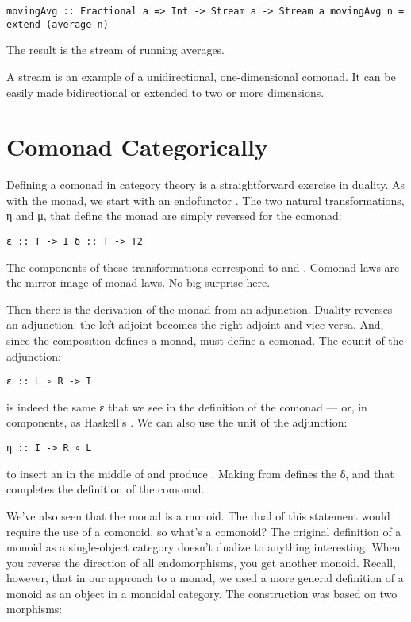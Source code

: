 \begin{verbatim}
movingAvg :: Fractional a => Int -> Stream a -> Stream a movingAvg n = extend (average n)
\end{verbatim}

The result is the stream of running averages.

A stream is an example of a unidirectional, one-dimensional comonad. It
can be easily made bidirectional or extended to two or more dimensions.

\section{Comonad Categorically}\label{comonad-categorically}

Defining a comonad in category theory is a straightforward exercise in
duality. As with the monad, we start with an endofunctor . The
two natural transformations, η and μ, that define the monad are simply
reversed for the comonad:

\begin{verbatim}
ε :: T -> I δ :: T -> T2
\end{verbatim}

The components of these transformations correspond to 
and . Comonad laws are the mirror image of monad laws.
No big surprise here.

Then there is the derivation of the monad from an adjunction. Duality
reverses an adjunction: the left adjoint becomes the right adjoint and
vice versa. And, since the composition  defines a monad,
 must define a comonad. The counit of the adjunction:

\begin{verbatim}
ε :: L ∘ R -> I
\end{verbatim}

is indeed the same ε that we see in the definition of the comonad ---
or, in components, as Haskell's . We can also use the
unit of the adjunction:

\begin{verbatim}
η :: I -> R ∘ L
\end{verbatim}

to insert an  in the middle of  and
produce . Making  from 
defines the δ, and that completes the definition of the comonad.

We've also seen that the monad is a monoid. The dual of this statement
would require the use of a comonoid, so what's a comonoid? The original
definition of a monoid as a single-object category doesn't dualize to
anything interesting. When you reverse the direction of all
endomorphisms, you get another monoid. Recall, however, that in our
approach to a monad, we used a more general definition of a monoid as an
object in a monoidal category. The construction was based on two
morphisms:

